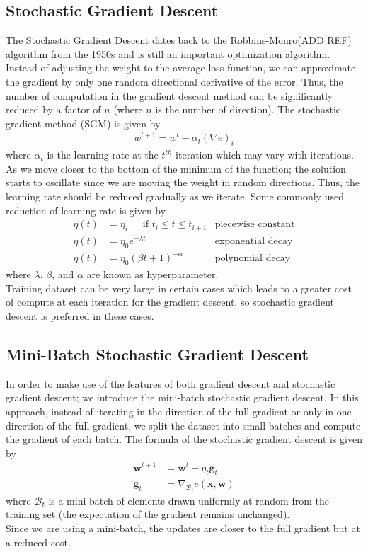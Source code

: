 \subsection*{Stochastic Gradient Descent}
The Stochastic Gradient Descent dates back to the Robbins-Monro(ADD REF) algorithm from the 1950s and is still an important optimization algorithm. Instead of adjusting the weight to the average loss function, we can approximate the gradient by only one random directional derivative of the error. Thus, the number of computation in the gradient descent method can be significantly reduced by a factor of $n$ (where $n$ is the number of direction). The stochastic gradient method (SGM) is given by 
\begin{align}
    \label{eq:SGM_def}
    w^{t+1} = w^{t} - \alpha_t {(\nabla e)}_i
\end{align}
where $\alpha_t$ is the learning rate at the $t^{th}$ iteration which may vary with iterations.\\
As we move closer to the bottom of the minimum of the function; the solution starts to oscillate since we are moving the weight in random directions. Thus, the learning rate should be reduced gradually as we iterate. Some commonly used reduction of learning rate is given by 
\begin{align}
    \label{eq: learning_rates}
        \eta(t) &= \eta_i \,\,\, \,\,\,\, \text{ if } t_i \leq t \leq t_{i+1} &\text{piecewise constant} \\
        \eta(t) &= \eta_0e^{-\lambda t} &\text{exponential decay} \\
        \eta(t) & = \eta_0 (\beta t + 1)^{-\alpha} &\text{polynomial decay}
\end{align}
where $\lambda$, $\beta$, and $\alpha$ are known as hyperparameter. \\
Training dataset can be very large in certain cases which leads to a greater cost of compute at each iteration for the gradient descent, so stochastic gradient descent is preferred in these cases.
\subsection*{Mini-Batch Stochastic Gradient Descent}
In order to make use of the features of both gradient descent and stochastic gradient descent; we introduce the mini-batch stochastic gradient descent. In this approach, instead of iterating in the direction of the full gradient or only in one direction of the full gradient, we split the dataset into small batches and compute the gradient of each batch. The formula of the stochastic gradient descent is given by 
\begin{align}
    \label{mb-sgd}
    \textbf{w}^{t+1} &= \textbf{w}^{t} - \eta_t \textbf{g}_t \\
    \nonumber
    \textbf{g}_t &= \nabla_{\mathcal{B}_t}e(\textbf{x},\textbf{w}) 
\end{align}
where $\mathcal{B}_t$ is a mini-batch of elements drawn uniformly at random from the training set (the expectation of the gradient remains unchanged). \\ Since we are using a mini-batch, the updates are closer to the full gradient but at a reduced cost.
